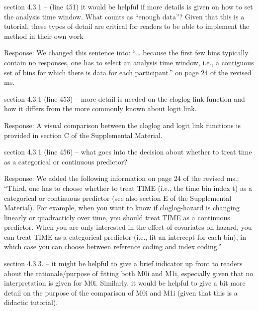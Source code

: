 \documentclass[
]{article}
\renewenvironment{quote}{\begin{leftbar}}{\end{leftbar}}
\begin{document}
\begin{quote}
section 4.3.1 -- (line 451) it would be helpful if more details is given
on how to set the analysis time window. What counts as ``enough data''?
Given that this is a tutorial, these types of detail are critical for
readers to be able to implement the method in their own work
\end{quote}

Response: We changed this sentence into: ``\ldots{} because the first
few bins typically contain no responses, one has to select an analysis
time window, i.e., a contiguous set of bins for which there is data for
each participant.'' on page 24 of the revised ms.

\begin{quote}
section 4.3.1 (line 453) -- more detail is needed on the cloglog link
function and how it differs from the more commonly known about logit
link.
\end{quote}

Response: A visual comparison between the cloglog and logit link
functions is provided in section C of the Supplemental Material.

\begin{quote}
section 4.3.1 (line 456) -- what goes into the decision about whether to
treat time as a categorical or continuous predictor?
\end{quote}

Response: We added the following information on page 24 of the revised
ms.: ``Third, one has to choose whether to treat TIME (i.e., the time
bin index t) as a categorical or continuous predictor (see also section
E of the Supplemental Material). For example, when you want to know if
cloglog-hazard is changing linearly or quadracticly over time, you
should treat TIME as a continuous predictor. When you are only
interested in the effect of covariates on hazard, you can treat TIME as
a categorical predictor (i.e., fit an intercept for each bin), in which
case you can choose between reference coding and index coding.''

\begin{quote}
section 4.3.3. -- it might be helpful to give a brief indicator up front
to readers about the rationale/purpose of fitting both M0i and M1i,
especially given that no interpretation is given for M0i. Similarly, it
would be helpful to give a bit more detail on the purpose of the
comparison of M0i and M1i (given that this is a didactic tutorial).
\end{quote}
\end{document}
